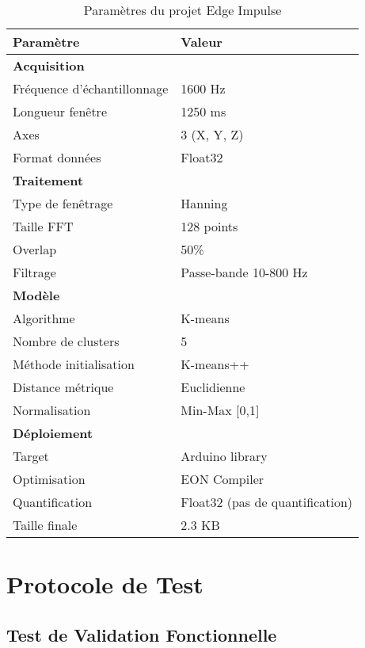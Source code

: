 \begin{table}[h]
\centering
\caption{Paramètres du projet Edge Impulse}
\begin{tabular}{ll}
\toprule
\textbf{Paramètre} & \textbf{Valeur} \\
\midrule
\multicolumn{2}{l}{\textbf{Acquisition}} \\
Fréquence d'échantillonnage & 1600 Hz \\
Longueur fenêtre & 1250 ms \\
Axes & 3 (X, Y, Z) \\
Format données & Float32 \\
\midrule
\multicolumn{2}{l}{\textbf{Traitement}} \\
Type de fenêtrage & Hanning \\
Taille FFT & 128 points \\
Overlap & 50\% \\
Filtrage & Passe-bande 10-800 Hz \\
\midrule
\multicolumn{2}{l}{\textbf{Modèle}} \\
Algorithme & K-means \\
Nombre de clusters & 5 \\
Méthode initialisation & K-means++ \\
Distance métrique & Euclidienne \\
Normalisation & Min-Max [0,1] \\
\midrule
\multicolumn{2}{l}{\textbf{Déploiement}} \\
Target & Arduino library \\
Optimisation & EON Compiler \\
Quantification & Float32 (pas de quantification) \\
Taille finale & 2.3 KB \\
\bottomrule
\end{tabular}
\end{table}

\section{Protocole de Test}

\subsection{Test de Validation Fonctionnelle}

